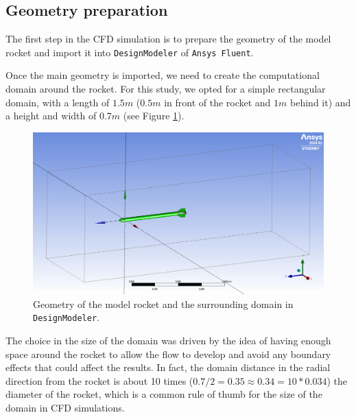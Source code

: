 \subsection{Geometry preparation}
\label{subsec:geometry_preparation}

The first step in the CFD simulation is to prepare the geometry of the model rocket and import it into \texttt{DesignModeler} of \texttt{Ansys Fluent}.

Once the main geometry is imported, we need to create the computational domain around the rocket.
For this study, we opted for a simple rectangular domain, with a length of $1.5m$ ($0.5m$ in front of the rocket and $1m$ behind it) and a height and width of $0.7m$ (see Figure \ref{fig:rocket_geometry}).

\begin{figure}[H]
    \centering
    \includegraphics[width=.7\textwidth]{img/DesignModeler.png}
    \caption{Geometry of the model rocket and the surrounding domain in \texttt{DesignModeler}.}
    \label{fig:rocket_geometry}
\end{figure}

The choice in the size of the domain was driven by the idea of having enough space around the rocket to allow the flow to develop and avoid any boundary effects that could affect the results.
In fact, the domain distance in the radial direction from the rocket is about 10 times ($0.7/2 = 0.35 \approx 0.34 = 10 * 0.034$) the diameter of the rocket, which is a common rule of thumb for the size of the domain in CFD simulations.

